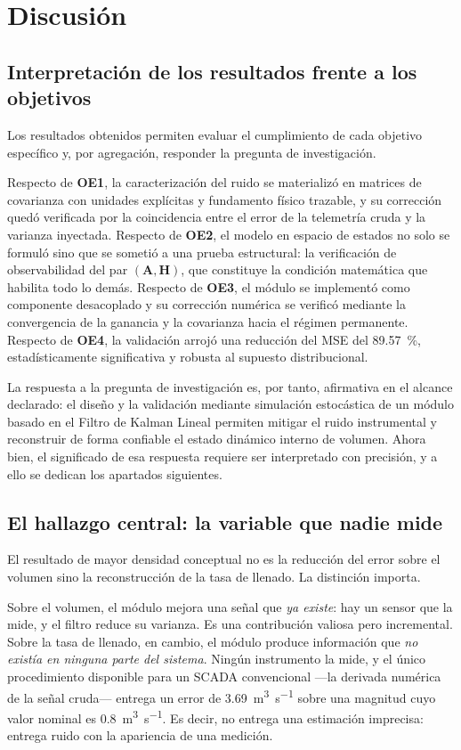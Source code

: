 \section{Discusión}
\label{sec:discusion}

\subsection{Interpretación de los resultados frente a los objetivos}

Los resultados obtenidos permiten evaluar el cumplimiento de cada objetivo
específico y, por agregación, responder la pregunta de investigación.

Respecto de \textbf{OE1}, la caracterización del ruido se materializó en
matrices de covarianza con unidades explícitas y fundamento físico trazable, y
su corrección quedó verificada por la coincidencia entre el error de la
telemetría cruda y la varianza inyectada. Respecto de \textbf{OE2}, el modelo en
espacio de estados no solo se formuló sino que se sometió a una prueba
estructural: la verificación de observabilidad del par
$(\mathbf{A}, \mathbf{H})$, que constituye la condición matemática que habilita
todo lo demás. Respecto de \textbf{OE3}, el módulo se implementó como
componente desacoplado y su corrección numérica se verificó mediante la
convergencia de la ganancia y la covarianza hacia el régimen permanente.
Respecto de \textbf{OE4}, la validación arrojó una reducción del MSE del
\SI{89,57}{\percent}, estadísticamente significativa y robusta al supuesto
distribucional.

La respuesta a la pregunta de investigación es, por tanto, afirmativa en el
alcance declarado: el diseño y la validación mediante simulación estocástica de
un módulo basado en el Filtro de Kalman Lineal permiten mitigar el ruido
instrumental y reconstruir de forma confiable el estado dinámico interno de
volumen. Ahora bien, el significado de esa respuesta requiere ser interpretado
con precisión, y a ello se dedican los apartados siguientes.

\subsection{El hallazgo central: la variable que nadie mide}

El resultado de mayor densidad conceptual no es la reducción del error sobre el
volumen sino la reconstrucción de la tasa de llenado. La distinción importa.

Sobre el volumen, el módulo mejora una señal que \emph{ya existe}: hay un sensor
que la mide, y el filtro reduce su varianza. Es una contribución valiosa pero
incremental. Sobre la tasa de llenado, en cambio, el módulo produce información
que \emph{no existía en ninguna parte del sistema}. Ningún instrumento la mide,
y el único procedimiento disponible para un SCADA convencional —la derivada
numérica de la señal cruda— entrega un error de
\SI{3,69}{\metre\cubed\per\second} sobre una magnitud cuyo valor nominal es
\SI{0,8}{\metre\cubed\per\second}. Es decir, no entrega una estimación
imprecisa: entrega ruido con la apariencia de una medición.

